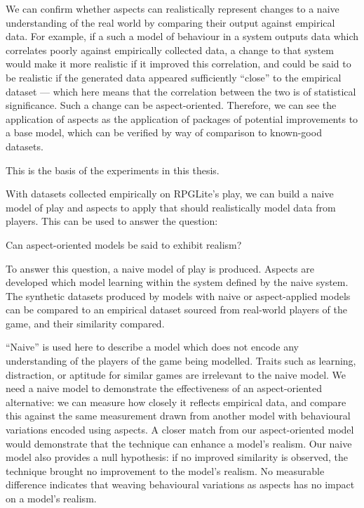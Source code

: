 We can confirm whether aspects can realistically represent changes to a naive
understanding of the real world by comparing their output against empirical
data. For example, if a such a model of behaviour in a system outputs data which
correlates poorly against empirically collected data, a change to that system
would make it more realistic if it improved this correlation, and could be said
to be realistic if the generated data appeared sufficiently ``close'' to the
empirical dataset --- which here means that the correlation between the two is
of statistical significance. Such a change can be aspect-oriented. Therefore, we
can see the application of aspects as the application of packages of potential
improvements to a base model, which can be verified by way of comparison to
known-good datasets.

This is the basis of the experiments in this thesis.

With datasets collected empirically on RPGLite's play, we can build a naive
model of play and aspects to apply that should realistically model data from
players. This can be used to answer the question:

\begin{researchquestion}
    Can aspect-oriented models be said to exhibit realism?
\end{researchquestion}


To answer this question, a naive model of play is produced. Aspects are
developed which model learning within the system defined by the naive system.
The synthetic datasets produced by models with naive or aspect-applied models
can be compared to an empirical dataset sourced from real-world players of the
game, and their similarity compared. 

``Naive'' is used here to describe a model which does not encode any
understanding of the players of the game being modelled. Traits such as
learning, distraction, or aptitude for similar games are irrelevant to the naive
model. We need a naive model to demonstrate the effectiveness of an
aspect-oriented alternative: we can measure how closely it reflects empirical
data, and compare this against the same measurement drawn from another model
with behavioural variations encoded using aspects. A closer match from our
aspect-oriented model would demonstrate that the technique can enhance a model's
realism. Our naive model also provides a null hypothesis: if no improved
similarity is observed, the technique brought no improvement to the model's
realism. No measurable difference indicates that weaving behavioural variations
as aspects has no impact on a model's realism.

